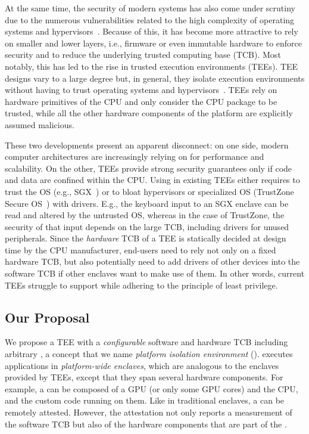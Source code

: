 At the same time, the security of modern systems has also come under scrutiny due to the numerous vulnerabilities related to the high complexity of operating systems and hypervisors~\cite{checkoway2013iago,suzaki2011memory}.
Because of this, it has become more attractive to rely on smaller and lower layers, i.e., firmware or even immutable hardware to enforce security and to reduce the underlying trusted computing base (TCB).
Most notably, this has led to the rise in trusted execution environments (TEEs). 
TEE designs vary to a large degree but, in general, they isolate execution environments without having to trust operating systems and hypervisors~\cite{costan2016intel,winter2008trusted,costan2016sanctum}. TEEs rely on hardware primitives of the CPU and only consider the CPU package to be trusted, while all the other hardware components of the platform are explicitly assumed malicious. 

These two developments present an apparent disconnect: on one side, modern computer architectures are increasingly relying on \sphw for performance and scalability. On the other, TEEs provide strong security guarantees only if code and data are confined within the CPU.
Using \sphw in existing TEEs either requires to trust the OS (e.g., SGX~\cite{costan2016intel}) or to bloat hypervisors or specialized OS (TrustZone Secure OS~\cite{TZOS}) with drivers. E.g., the keyboard input to an SGX enclave can be read and altered by the untrusted OS, whereas in the case of TrustZone, the security of that input depends on the large TCB, including drivers for unused peripherals. Since the \emph{hardware} TCB of a TEE is statically decided at design time by the CPU manufacturer, end-users need to rely not only on a fixed hardware TCB, but also potentially need to add drivers of other devices into the software TCB if other enclaves want to make use of them. In other words, current TEEs struggle to support \sphw while adhering to the principle of least privilege.


\subsection{Our Proposal}

We propose a TEE with a \emph{configurable} software and hardware TCB including arbitrary \sphw, a concept that we name \emph{platform isolation environment} (\name). \name executes applications in \emph{platform-wide enclaves}, which are analogous to the enclaves provided by TEEs, except that they span several hardware components. For example, a \nameenclave{} can be composed of a GPU (or only some GPU cores) and the CPU, and the custom code running on them. Like in traditional enclaves, a \nameenclave{} can be remotely attested. However, the \name attestation not only reports a measurement of the software TCB but also of the hardware components that are part of the \nameenclave{}.

